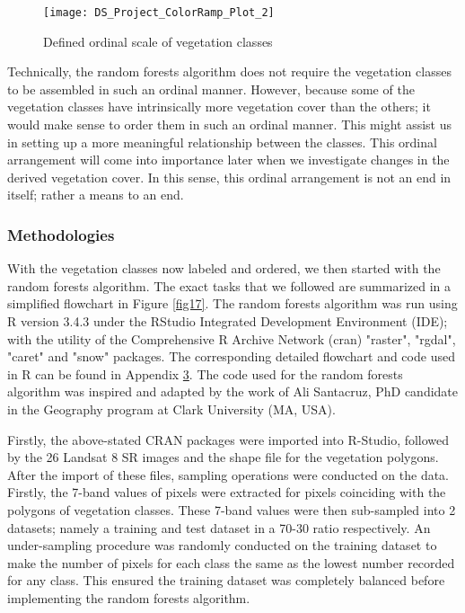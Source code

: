 \begin{figure}[H]
	\centering
	\texttt{[image: DS\_Project\_ColorRamp\_Plot\_2]}
	\caption{Defined ordinal scale of vegetation classes }\label{fig16}
\end{figure}

\justify
Technically, the random forests algorithm does not require the vegetation classes to be assembled in such an ordinal manner. However, because some of the vegetation classes have intrinsically more vegetation cover than the others; it would make sense to order them in such an ordinal manner. This might assist us in setting up a more meaningful relationship between the classes. This ordinal arrangement will come into importance later when we investigate changes in the derived vegetation cover. In this sense, this ordinal arrangement is not an end in itself; rather a means to an end.

\subsubsection{Methodologies}

\justify
With the vegetation classes now labeled and ordered, we then started with the random forests algorithm. The exact tasks that we followed are summarized in a simplified flowchart in Figure \ref{fig17}. The random forests algorithm was run using R version 3.4.3 under the RStudio Integrated Development Environment (IDE); with the utility of the Comprehensive R Archive Network (\ac{cran}) "raster", "rgdal", "caret" and "snow" packages. The corresponding detailed flowchart and code used in R can be found in Appendix \hyperref[app2]{3}. The code used for the random forests algorithm was inspired and adapted by the work of Ali Santacruz, PhD candidate in the Geography program at Clark University (MA, USA).

\justify
Firstly, the above-stated CRAN packages were imported into R-Studio, followed by the 26 Landsat 8 SR images and the shape file for the vegetation polygons. After the import of these files, sampling operations were conducted on the data. Firstly, the 7-band values of pixels were extracted for pixels coinciding with the polygons of vegetation classes. These 7-band values were then sub-sampled into 2 datasets; namely a training and test dataset in a 70-30 ratio respectively. An under-sampling procedure was randomly conducted on the training dataset to make the number of pixels for each class the same as the lowest number recorded for any class. This ensured the training dataset was completely balanced before implementing the random forests algorithm.

